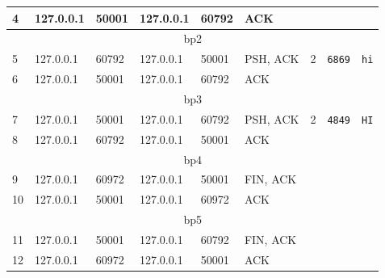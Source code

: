\documentclass{scrartcl}
\begin{document}
\begin{figure}[H]
\begin{tabular}{|lllllllll|}
\multicolumn{1}{|l|}{4} & \multicolumn{1}{l|}{127.0.0.1} & \multicolumn{1}{l|}{50001} & \multicolumn{1}{l|}{127.0.0.1} & \multicolumn{1}{l|}{60792} & \multicolumn{1}{l|}{ACK} & \multicolumn{1}{l|}{} & \multicolumn{1}{l|}{} &  \\ \hline
\multicolumn{9}{|c|}{bp2} \\ \hline
\multicolumn{1}{|l|}{5} & \multicolumn{1}{l|}{127.0.0.1} & \multicolumn{1}{l|}{60792} & \multicolumn{1}{l|}{127.0.0.1} & \multicolumn{1}{l|}{50001} & \multicolumn{1}{l|}{PSH, ACK} & \multicolumn{1}{l|}{2} & \multicolumn{1}{l|}{\texttt{6869}} & \texttt{hi} \\ \hline
\multicolumn{1}{|l|}{6} & \multicolumn{1}{l|}{127.0.0.1} & \multicolumn{1}{l|}{50001} & \multicolumn{1}{l|}{127.0.0.1} & \multicolumn{1}{l|}{60792} & \multicolumn{1}{l|}{ACK} & \multicolumn{1}{l|}{} & \multicolumn{1}{l|}{} &  \\ \hline
\multicolumn{9}{|c|}{bp3} \\ \hline
\multicolumn{1}{|l|}{7} & \multicolumn{1}{l|}{127.0.0.1} & \multicolumn{1}{l|}{50001} & \multicolumn{1}{l|}{127.0.0.1} & \multicolumn{1}{l|}{60792} & \multicolumn{1}{l|}{PSH, ACK} & \multicolumn{1}{l|}{2} & \multicolumn{1}{l|}{\texttt{4849}} & \texttt{HI} \\ \hline
\multicolumn{1}{|l|}{8} & \multicolumn{1}{l|}{127.0.0.1} & \multicolumn{1}{l|}{60792} & \multicolumn{1}{l|}{127.0.0.1} & \multicolumn{1}{l|}{50001} & \multicolumn{1}{l|}{ACK} & \multicolumn{1}{l|}{} & \multicolumn{1}{l|}{} &  \\ \hline
\multicolumn{9}{|c|}{bp4} \\ \hline
\multicolumn{1}{|l|}{9} & \multicolumn{1}{l|}{127.0.0.1} & \multicolumn{1}{l|}{60972} & \multicolumn{1}{l|}{127.0.0.1} & \multicolumn{1}{l|}{50001} & \multicolumn{1}{l|}{FIN, ACK} & \multicolumn{1}{l|}{} & \multicolumn{1}{l|}{} &  \\ \hline
\multicolumn{1}{|l|}{10} & \multicolumn{1}{l|}{127.0.0.1} & \multicolumn{1}{l|}{50001} & \multicolumn{1}{l|}{127.0.0.1} & \multicolumn{1}{l|}{60972} & \multicolumn{1}{l|}{ACK} & \multicolumn{1}{l|}{} & \multicolumn{1}{l|}{} &  \\ \hline
\multicolumn{9}{|c|}{bp5} \\ \hline
\multicolumn{1}{|l|}{11} & \multicolumn{1}{l|}{127.0.0.1} & \multicolumn{1}{l|}{50001} & \multicolumn{1}{l|}{127.0.0.1} & \multicolumn{1}{l|}{60792} & \multicolumn{1}{l|}{FIN, ACK} & \multicolumn{1}{l|}{} & \multicolumn{1}{l|}{} &  \\ \hline
\multicolumn{1}{|l|}{12} & \multicolumn{1}{l|}{127.0.0.1} & \multicolumn{1}{l|}{60972} & \multicolumn{1}{l|}{127.0.0.1} & \multicolumn{1}{l|}{50001} & \multicolumn{1}{l|}{ACK} & \multicolumn{1}{l|}{} & \multicolumn{1}{l|}{} &  \\ \hline
\end{tabular}
\end{figure}
\end{document}
